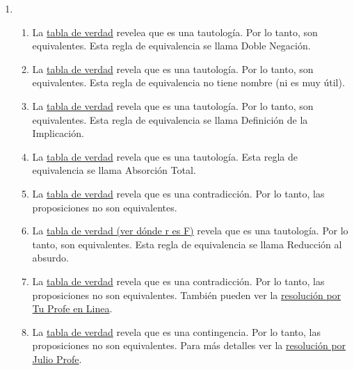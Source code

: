\documentclass[a4paper]{article}
\newcommand{\exercise}{\item}
\begin{document}
\begin{enumerate}
\begin{enumerate} [label=(\alph*)]
		\item Es contradicción. \href{https://youtu.be/rlJmcBGdOoY}{Resolución por ProfeGuille}.
		\item Es tautología. \href{https://youtu.be/k-amMQR3oMc}{Resolución por ProfeGuille}.
\end{enumerate}\exercise\begin{enumerate} [label=(\alph*)]		\item La \href{https://www.wolframalpha.com/input?i=truth+table%3A+not+%28not+p%29+%3C%3D%3E+p}{tabla de verdad} revelea que es una tautología. Por lo tanto, son equivalentes. Esta regla de equivalencia se llama Doble Negación.
		\item La \href{https://www.wolframalpha.com/input?i=truth+table%3A%28not+p+%3D%3E+p%29+%3C%3D%3E+p}{tabla de verdad} revela que es una tautología. Por lo tanto, son equivalentes. Esta regla de equivalencia no tiene nombre (ni es muy útil). 
		\item La \href{https://www.wolframalpha.com/input?i=%28p+%3D%3E+q%29+%3C%3D%3E+not+q+%3D%3E+not+p}{tabla de verdad} revela que es una tautología. Por lo tanto, son equivalentes. Esta regla de equivalencia se llama Definición de la Implicación.
		\item La \href{https://www.wolframalpha.com/input?i=%28p+and+%28p+or++q%29%29+%3C%3D%3E++p}{tabla de verdad} revela que es una tautología. Esta regla de equivalencia se llama Absorción Total.
		\item La \href{https://www.wolframalpha.com/input?i=%28not+p+or+not+q%29+%3C%3D%3E+%28p+and+q%29}{tabla de verdad} revela que es una contradicción. Por lo tanto, las proposiciones no son equivalentes.
		\item La \href{https://www.wolframalpha.com/input?i=%28p+%3D%3E+q%29+%3C%3D%3E+%28%28p+and+not+q%29+%3D%3E+r%29}{tabla de verdad (ver dónde r es F)} revela que es una tautología. Por lo tanto, son equivalentes. Esta regla de equivalencia se llama Reducción al absurdo.
		\item La \href{https://www.wolframalpha.com/input?i=%28p+and+not+q%29+%3C%3D%3E+%28not+p+or+q%29}{tabla de verdad} revela que es una contradicción. Por lo tanto, las proposiciones no son equivalentes. También pueden ver la \href{https://youtu.be/NZSuHeymu4M?t=639}{resolución por Tu Profe en Linea}.
		\item La \href{https://www.wolframalpha.com/input?i=%28p+%3D%3E+%28q+or+r%29%29+%3C%3D%3E+%28%28p+and+r%29+%3D%3E+%5Cneg+q%29}{tabla de verdad} revela que es una contingencia. Por lo tanto, las proposiciones no son equivalentes. Para más detalles ver la \href{https://www.youtube.com/live/-yHPDgU-lfE?feature=share&t=578}{resolución por Julio Profe}.

\end{enumerate}
\end{enumerate}
\end{document}
